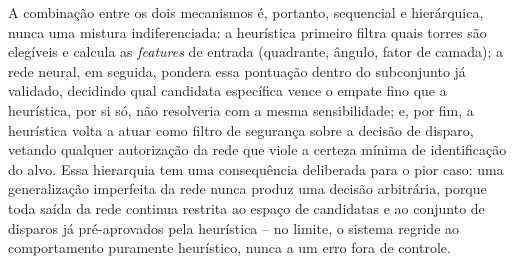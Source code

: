 \documentclass[12pt,a4paper]{article}
\begin{document}
A combinação entre os dois mecanismos é, portanto, sequencial e hierárquica, nunca uma mistura
indiferenciada: a heurística primeiro filtra quais torres são elegíveis e calcula as
\textit{features} de entrada (quadrante, ângulo, fator de camada); a rede neural, em seguida,
pondera essa pontuação dentro do subconjunto já validado, decidindo qual candidata específica
vence o empate fino que a heurística, por si só, não resolveria com a mesma sensibilidade; e, por
fim, a heurística volta a atuar como filtro de segurança sobre a decisão de disparo, vetando
qualquer autorização da rede que viole a certeza mínima de identificação do alvo. Essa hierarquia
tem uma consequência deliberada para o pior caso: uma generalização
imperfeita da rede nunca produz uma decisão arbitrária, porque toda saída da rede continua restrita
ao espaço de candidatas e ao conjunto de disparos já pré-aprovados pela heurística -- no limite, o
sistema regride ao comportamento puramente heurístico, nunca a um erro fora de controle.
\end{document}
